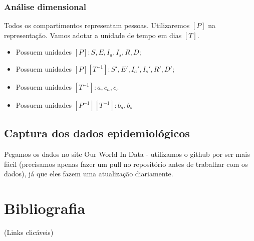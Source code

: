\documentclass{article}
\begin{document}
\subsubsection{Análise dimensional}
Todos os compartimentos representam pessoas. Utilizaremos $[P]$ na representação. Vamos adotar a unidade de tempo em dias $[T]$.
\begin{itemize}
    \item Possuem unidades $[P]: S, E, I_a, I_s, R, D;$
    \item Possuem unidades $[P][T^{-1}]: S', E', I_a ', I_s ', R', D';$
    \item Possuem unidades $[T^{-1}]: a, c_a, c_s$
    \item Possuem unidades $[P^{-1}][T^{-1}]: b_a, b_s$
\end{itemize}

\subsection{Captura dos dados epidemiológicos}
Pegamos os dados no site Our World In Data - utilizamos o github por ser mais fácil (precisamos apenas fazer um pull no repositório antes de trabalhar com os dados), já que eles fazem uma atualização diariamente.


\section{Bibliografia}
(Links clicáveis)
\end{document}
